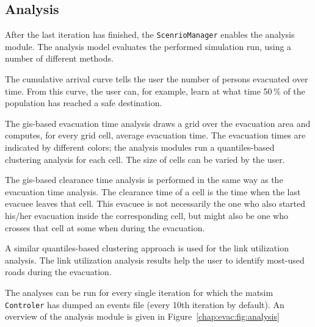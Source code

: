 \subsection{Analysis}
After the last iteration has finished, the \lstinline|ScenrioManager| enables the analysis module. The analysis model evaluates the performed simulation run, using a number of different methods. 
\begin{compactitem}
\item The cumulative arrival curve tells the user the number of persons evacuated over time. From this curve, the user can, for example, learn at what time 50\,\% of the population has reached a safe destination.
\item The \gls{gis}-based evacuation time analysis draws a grid over the evacuation area and computes, for every grid cell, average evacuation time. The evacuation times are indicated by different colors; the analysis modules run a quantiles-based clustering analysis for each cell. The size of cells can be varied  by the user.
\item The \gls{gis}-based clearance time analysis is performed in the same way as the evacuation time  analysis. The clearance time of a cell is the time when the last evacuee leaves that cell. This evacuee is not necessarily the one who also started his/her evacuation inside the corresponding cell, but might also be one who crosses that cell at some when during the evacuation.
\item A similar quantiles-based clustering approach is used for the link utilization analysis. The link utilization analysis results help the user to identify most-used roads during the evacuation.
\end{compactitem}
The analyses can be run for every single iteration for which the \gls{matsim} \lstinline|Controler| has dumped an events file (every 10th iteration by default). An overview of the analysis module is given in Figure~\ref{chap:evac:fig:analysis}

